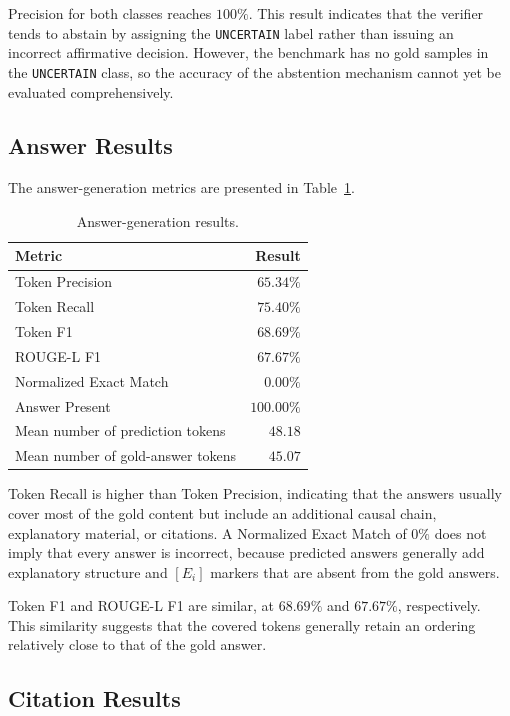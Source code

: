 Precision for both classes reaches \(100\%\). This result indicates that the
verifier tends to abstain by assigning the \texttt{UNCERTAIN} label rather
than issuing an incorrect affirmative decision. However, the benchmark has
no gold samples in the \texttt{UNCERTAIN} class, so the accuracy of the
abstention mechanism cannot yet be evaluated comprehensively.

\subsection{Answer Results}

The answer-generation metrics are presented in
Table~\ref{tab:answer-results}.

\begin{table}[t]
    \centering
    \caption{Answer-generation results.}
    \label{tab:answer-results}
    \begin{tabular}{lr}
        \hline
        \textbf{Metric} & \textbf{Result} \\
        \hline
        Token Precision & \(65.34\%\) \\
        Token Recall & \(75.40\%\) \\
        Token F1 & \(68.69\%\) \\
        ROUGE-L F1 & \(67.67\%\) \\
        Normalized Exact Match & \(0.00\%\) \\
        Answer Present & \(100.00\%\) \\
        Mean number of prediction tokens & \(48.18\) \\
        Mean number of gold-answer tokens & \(45.07\) \\
        \hline
    \end{tabular}
\end{table}

Token Recall is higher than Token Precision, indicating that the answers
usually cover most of the gold content but include an additional causal
chain, explanatory material, or citations. A Normalized Exact Match of
\(0\%\) does not imply that every answer is incorrect, because predicted
answers generally add explanatory structure and \([E_i]\) markers that are
absent from the gold answers.

Token F1 and ROUGE-L F1 are similar, at \(68.69\%\) and \(67.67\%\),
respectively. This similarity suggests that the covered tokens generally
retain an ordering relatively close to that of the gold answer.

\subsection{Citation Results}

